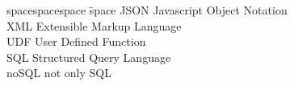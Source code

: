 
\begin{tabbing}
spacespacespace \= space \kill
JSON	 \> 	Javascript Object Notation	 \\
XML	 \> 	Extensible Markup Language	 \\
UDF	 \> 	User Defined Function	 \\
SQL	 \> 	Structured Query Language	 \\
noSQL	 \> 	not only SQL	 \\

\end{tabbing}
\endinput
